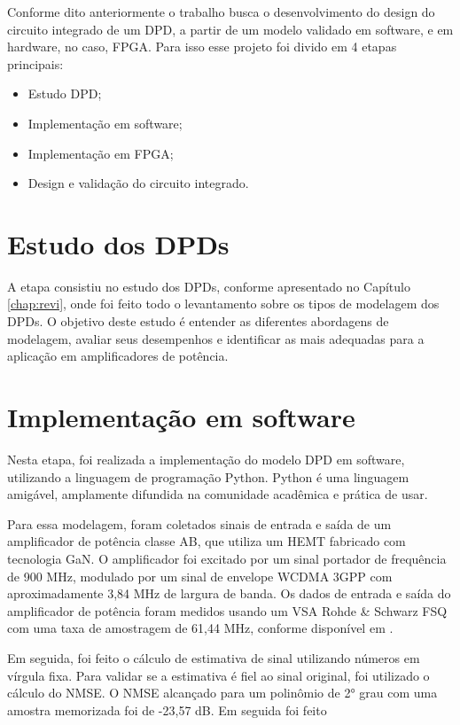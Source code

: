 Conforme dito anteriormente o trabalho busca o desenvolvimento do design do circuito integrado de um DPD, a partir de um modelo validado em software, e em hardware, no caso, FPGA. Para isso esse projeto foi divido em 4 etapas principais:

\begin{itemize}
    \item Estudo DPD;
    \item Implementação em software;
    \item Implementação em FPGA;
    \item Design e validação do circuito integrado.
\end{itemize}

\section{Estudo dos DPDs}
A etapa consistiu no estudo dos DPDs, conforme apresentado no Capítulo \ref{chap:revi}, onde foi feito todo o levantamento sobre os tipos de modelagem dos DPDs. O objetivo deste estudo é entender as diferentes abordagens de modelagem, avaliar seus desempenhos e identificar as mais adequadas para a aplicação em amplificadores de potência.

\section{Implementação em software}

Nesta etapa, foi realizada a implementação do modelo DPD em software, utilizando a linguagem de programação Python. Python é uma linguagem amigável, amplamente difundida na comunidade acadêmica e prática de usar.

Para essa modelagem, foram coletados sinais de entrada e saída de um amplificador de potência classe AB, que utiliza um HEMT fabricado com tecnologia GaN. O amplificador foi excitado por um sinal portador de frequência de 900 MHz, modulado por um sinal de envelope WCDMA 3GPP com aproximadamente 3,84 MHz de largura de banda. Os dados de entrada e saída do amplificador de potência foram medidos usando um VSA Rohde & Schwarz FSQ com uma taxa de amostragem de 61,44 MHz, conforme disponível em \cite{Bonfim2016}.

Em seguida, foi feito o cálculo de estimativa de sinal utilizando números em vírgula fixa. Para validar se a estimativa é fiel ao sinal original, foi utilizado o cálculo do NMSE. O NMSE alcançado para um polinômio de 2° grau com uma amostra memorizada foi de -23,57 dB. Em seguida foi feito 

